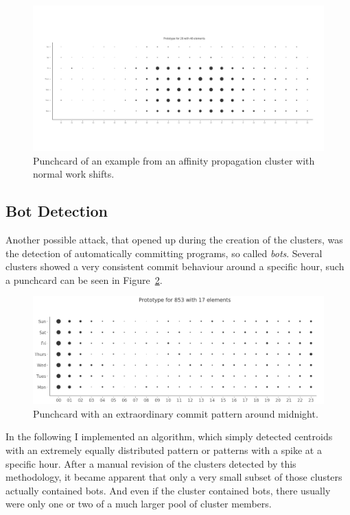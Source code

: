 \begin{figure}[H]
    \includegraphics[scale=0.32]{./graphs/analysis-affinity/28}
    \centering
    \caption{Punchcard of an example from an affinity propagation cluster with normal work shifts.}\label{fig:random-sleep-rhythm}
\end{figure}


\subsection{Bot Detection}
Another possible attack, that opened up during the creation of the clusters, was the detection of automatically committing programs, so called \emph{bots}.
Several clusters showed a very consistent commit behaviour around a specific hour, such a punchcard can be seen in Figure~\ref{fig:bot-punchcard}.

\begin{figure}[H]
    \includegraphics[scale=0.32]{./graphs/analysis/bot-punchcard}
    \centering
    \caption{Punchcard with an extraordinary commit pattern around midnight.}\label{fig:bot-punchcard}
\end{figure}


In the following I implemented an algorithm, which simply detected centroids with an extremely equally distributed pattern or patterns with a spike at a specific hour.
After a manual revision of the clusters detected by this methodology, it became apparent that only a very small subset of those clusters actually contained bots.
And even if the cluster contained bots, there usually were only one or two of a much larger pool of cluster members.


